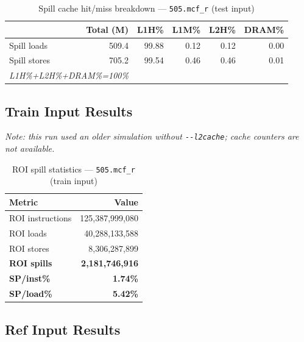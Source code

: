 \documentclass[11pt,a4paper]{article}
\begin{document}
\begin{table}[H]
\centering
\caption{Spill cache hit/miss breakdown --- \texttt{505.mcf\_r} (test input)}
\label{tab:mcf_test_cache}
\begin{tabular}{lrrrrr}
\toprule
\textbf{} & \textbf{Total (M)} & \textbf{L1H\%} & \textbf{L1M\%} & \textbf{L2H\%} & \textbf{DRAM\%} \\
\midrule
Spill loads  & 509.4 & 99.88 & 0.12 & 0.12 & 0.00 \\
Spill stores & 705.2 & 99.54 & 0.46 & 0.46 & 0.01 \\
\multicolumn{2}{l}{\small\textit{L1H\%+L2H\%+DRAM\%=100\%}} \\
\bottomrule
\end{tabular}
\end{table}

\subsection{Train Input Results}

\textit{Note: this run used an older simulation without \texttt{-{}-l2cache}; cache counters are not available.}


\begin{table}[H]
\centering
\caption{ROI spill statistics --- \texttt{505.mcf\_r} (train input)}
\label{tab:mcf_train_roi}
\begin{tabular}{lr}
\toprule
\textbf{Metric} & \textbf{Value} \\
\midrule
ROI instructions & 125,387,999,080 \\
ROI loads        & 40,288,133,588 \\
ROI stores       & 8,306,287,899 \\
\textbf{ROI spills}   & \textbf{2,181,746,916} \\
\textbf{SP/inst\%}   & \textbf{1.74\%} \\
\textbf{SP/load\%}   & \textbf{5.42\%} \\
\bottomrule
\end{tabular}
\end{table}

\subsection{Ref Input Results}
\end{document}
